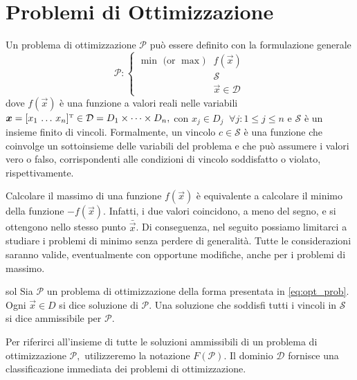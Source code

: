 \section{Problemi di Ottimizzazione}\label{sec:opt_prob}
Un problema di ottimizzazione \( \mathcal{P} \) può essere definito con la formulazione generale
\begin{equation}\label{eq:opt_prob}
    \mathcal{P}\colon
    \begin{cases}
        \text{$\min$ (or $\max$)} & f(\vec{x}) \\
                                  & \mathcal{S} \\
                                  & \vec{x} \in \mathcal{D}
    \end{cases}
\end{equation}
dove
\(
    f(\vec{x})
\)
è una funzione a valori reali nelle variabili
\(
    \bm{x} = [x_1 \, \ldots \, x_n]^{\scriptscriptstyle\mathrm{T}} \in \mathcal{D} = D_1 \times \dots \times D_n,
\)
con
\(
    x_j \in D_j \;\; \forall j \colon 1 \leq j \leq n
\)
e
\(
    \mathcal{S}
\)
è un insieme finito di vincoli. Formalmente, un vincolo
\(
    c \in \mathcal{S}
\)
è una funzione che coinvolge un sottoinsieme delle variabili del problema e che può assumere i valori vero o falso,
corrispondenti alle condizioni di vincolo soddisfatto o violato, rispettivamente.

Calcolare il massimo di una funzione
\(
    f(\vec{x})
\)
è equivalente a calcolare il minimo della funzione
\(
    -f(\vec{x})
\). Infatti, i due valori coincidono, a meno del segno, e si ottengono nello stesso punto
\(
    \bar{\vec{x}}
\).
Di conseguenza, nel seguito possiamo limitarci a studiare i problemi di minimo senza perdere di generalità. Tutte le
considerazioni saranno valide, eventualmente con opportune modifiche, anche per i problemi di massimo.
\begin{defbox}{}{sol}
    Sia \( \mathcal{P} \) un problema di ottimizzazione della forma presentata in \eqref{eq:opt_prob}. Ogni \( \vec{x}
    \in D \) si dice soluzione di \( \mathcal{P} \). Una soluzione che soddisfi tutti i vincoli in \( \mathcal{S} \) si
    dice ammissibile per \( \mathcal{P} \).
\end{defbox}
Per riferirci all'insieme di tutte le soluzioni ammissibili di un problema di ottimizzazione
\(
    \mathcal{P},
\)
utilizzeremo la notazione
\(
    F(\mathcal{P}).
\)
Il dominio \( \mathcal{D} \) fornisce una classificazione immediata dei problemi di ottimizzazione.

